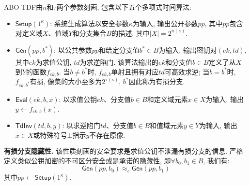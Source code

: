 \begin{definition}[全除一有损陷门函数]
ABO-TDF由$n$和$\tau$两个参数刻画, 包含以下五个多项式时间算法: 
\begin{itemize}
\item $\mathsf{Setup}(1^\kappa)$: 系统生成算法以安全参数$\kappa$为输入, 输出公开参数$pp$, 
	其中$pp$包含对定义域$X$、值域$Y$和分支集合$B$的描述. 其中$|X| = 2^{n(\kappa)}$.  

\item $\mathsf{Gen}(pp, b^*)$: 以公共参数$pp$和给定分支值$b^* \in B$为输入, 输出密钥对$(ek, td)$, 其中$ek$为求值公钥, $td$为求逆陷门. 
	该算法输出的$ek$和分支值$b \in B$定义了从$X$到$Y$的函数$f_{ek, b}$. 
	当$b \neq b^*$时, $f_{ek,b}$单射且拥有对应$td$可高效求逆; 当$b = b^*$时, $f_{ek, b^*}$有损, 
	像集的大小至多为$2^{\tau(\kappa)}$, $b^*$因此称为有损分支.  

\item $\mathsf{Eval}(ek, b, x)$: 以求值公钥$ek$、分支值$b \in B$和定义域元素$x \in X$为输入, 
	输出$y \leftarrow f_{ek, b}(x)$.  

\item $\mathsf{TdInv}(td, b, y)$: 以求逆陷门$td$、分支值$b \in B$和值域元素$y \in Y$为输入, 
	输出$x \in X$或特殊符号$\bot$指示$y$不存在原像.       
\end{itemize}

\begin{trivlist}
\item \textbf{有损分支隐藏性.} 该性质刻画的安全要求是求值公钥不泄漏有损分支的信息. 
	严格定义类似公钥加密的不可区分安全或是承诺的隐藏性, 即$\forall b_0, b_1 \in B$, 我们有:
	\begin{equation*}
		\mathsf{Gen}(pp, b_0) \approx_c \mathsf{Gen}(pp, b_1)
	\end{equation*}
	其中$pp \leftarrow \mathsf{Setup}(1^\kappa)$. 
\end{trivlist}
\end{definition}


